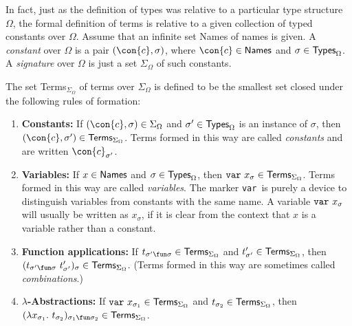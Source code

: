 In fact, just as the definition of types was relative to a particular
type structure $\Omega$, the formal definition of terms is relative to
a given collection of typed constants over $\Omega$.  Assume that an
infinite set {\sf Names} of names is given. A {\em constant\/} over
$\Omega$ is a pair $(\con{c}, \sigma)$, where $\con{c}\in{\sf Names}$
and $\sigma\in{\sf Types}_{\Omega}$. A {\em signature} over $\Omega$
is just a set $\Sigma_\Omega$ of such constants. 

The set {\sf Terms}$_{\Sigma_{\Omega}}$ of terms over
$\Sigma_{\Omega}$ is defined to be the smallest set closed under the
following rules of formation:
\begin{enumerate}

\item {\bf Constants:} If $(\con{c},\sigma)\in{\Sigma_{\Omega}}$ and
$\sigma'\in{\sf Types}_{\Omega}$ 
is an instance of $\sigma$, then $(\con{c},{\sigma'})\in{\sf
Terms}_{\Sigma_{\Omega}}$.  Terms formed in this way are called {\it
constants\/} and are written $\con{c}_{\sigma'}$.

\item {\bf Variables:}  If  $x\in{\sf  Names}$  and  $\sigma\in{\sf
Types}_{\Omega}$, then ${\tt var}\ x_{\sigma}\in{\sf
Terms}_{\Sigma_{\Omega}}$. Terms formed in this way are called {\it
variables}.  The marker {\tt var}\ is purely a device to
distinguish variables from constants with the same name.  A variable
${\tt var}\ x_{\sigma}$ will usually be written as $x_{\sigma}$, if it
is clear from the context that $x$ is a variable rather than a
constant.

\item {\bf Function applications:}  If $t_{\sigma'{\fun}\sigma}\in{\sf
Terms}_{\Sigma_{\Omega}}$ and $t'_{\sigma'}\in{\sf
Terms}_{\Sigma_{\Omega}}$, then $(t_{\sigma'\fun\sigma}\
t'_{\sigma'})_{\sigma}\in {\sf Terms}_{\Sigma_{\Omega}}$.
(Terms formed in this way are sometimes called {\it combinations}.)

\item {\bf $\lambda$-Abstractions:} If ${\tt var}\ x_{\sigma_1}
\in{\sf Terms}_{\Sigma_{\Omega}}$  and $t_{\sigma_2}\in{\sf
Terms}_{\Sigma_{\Omega}}$, then $(\lambda x_{\sigma_1}.\
t_{\sigma_2})_{\sigma_1\fun\sigma_2}
\in{\sf Terms}_{\Sigma_{\Omega}}$.

\end{enumerate}

